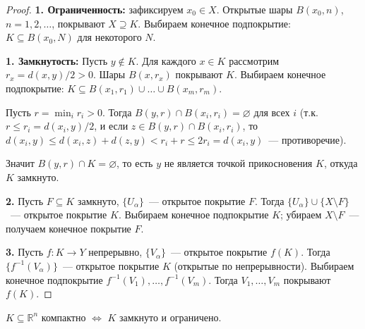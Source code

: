 \documentclass[12pt]{article}
\begin{document}
	\begin{proof}
		\textbf{1. Ограниченность:} зафиксируем $x_0 \in X$. Открытые шары $B(x_0, n)$, $n = 1, 2, \dots$, покрывают $X \supseteq K$. Выбираем конечное подпокрытие: $K \subseteq B(x_0, N)$ для некоторого $N$.
		
		\textbf{1. Замкнутость:} Пусть $y \notin K$. Для каждого $x \in K$ рассмотрим $r_x = d(x, y)/2 > 0$. Шары $B(x, r_x)$ покрывают $K$. Выбираем конечное подпокрытие: $K \subseteq B(x_1, r_1) \cup \dots \cup B(x_m, r_m)$.
		
		Пусть $r = \min_i r_i > 0$. Тогда $B(y, r) \cap B(x_i, r_i) = \varnothing$ для всех $i$ (т.к. $r \leqslant r_i = d(x_i, y)/2$, и если $z \in B(y, r) \cap B(x_i, r_i)$, то $d(x_i, y) \leqslant d(x_i, z) + d(z, y) < r_i + r \leqslant 2r_i = d(x_i, y)$~--- противоречие).
		
		Значит $B(y, r) \cap K = \varnothing$, то есть $y$ не является точкой прикосновения $K$, откуда $K$ замкнуто.
		
		\textbf{2.} Пусть $F \subseteq K$ замкнуто, $\{U_\alpha\}$~--- открытое покрытие $F$. Тогда $\{U_\alpha\} \cup \{X \setminus F\}$~--- открытое покрытие $K$. Выбираем конечное подпокрытие $K$; убираем $X \setminus F$~--- получаем конечное покрытие $F$.
		
		\textbf{3.} Пусть $f: K \to Y$ непрерывно, $\{V_\alpha\}$~--- открытое покрытие $f(K)$. Тогда $\{f^{-1}(V_\alpha)\}$~--- открытое покрытие $K$ (открытые по непрерывности). Выбираем конечное подпокрытие $f^{-1}(V_1), \dots, f^{-1}(V_m)$. Тогда $V_1, \dots, V_m$ покрывают $f(K)$.
	\end{proof}
	
	\begin{theorem}
		$K \subseteq \mathbb{R}^n$ компактно $\Leftrightarrow$ $K$ замкнуто и ограничено.
	\end{theorem}
	
\end{document}
